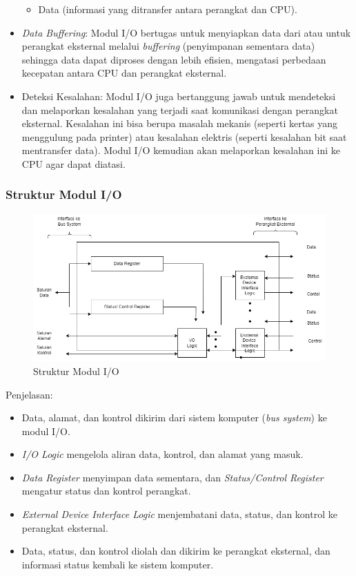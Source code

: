 \documentclass[12pt]{article}
\begin{document}
\begin{itemize}
\begin{itemize}
        \item Data (informasi yang ditransfer antara perangkat dan CPU). 
    \end{itemize} 
    \item \textit{Data Buffering}: Modul I/O bertugas untuk menyiapkan data dari atau untuk perangkat eksternal melalui \textit{buffering }(penyimpanan sementara data) sehingga data dapat diproses dengan lebih efisien, mengatasi perbedaan kecepatan antara CPU dan perangkat eksternal. \item Deteksi Kesalahan: Modul I/O juga bertanggung jawab untuk mendeteksi dan melaporkan kesalahan yang terjadi saat komunikasi dengan perangkat eksternal. Kesalahan ini bisa berupa masalah mekanis (seperti kertas yang menggulung pada printer) atau kesalahan elektris (seperti kesalahan bit saat mentransfer data). Modul I/O kemudian akan melaporkan kesalahan ini ke CPU agar dapat diatasi. 
\end{itemize}

\subsubsection{Struktur Modul I/O} 
\begin{figure}[h] 
    \centering 
    \includegraphics[width=0.80\linewidth]{b_class/asset/sisop.drawio.png} 
    \caption{Struktur Modul I/O} \label{fig} 
\end{figure} 
Penjelasan: \begin{itemize} \item Data, alamat, dan kontrol dikirim dari sistem komputer (\textit{bus system}) ke modul I/O. \item \textit{I/O Logic} mengelola aliran data, kontrol, dan alamat yang masuk. \item \textit{Data Register} menyimpan data sementara, dan \textit{Status/Control Register} mengatur status dan kontrol perangkat. \item \textit{External Device Interface Logic} menjembatani data, status, dan kontrol ke perangkat eksternal. \item Data, status, dan kontrol diolah dan dikirim ke perangkat eksternal, dan informasi status kembali ke sistem komputer. \end{itemize}
\end{document}
